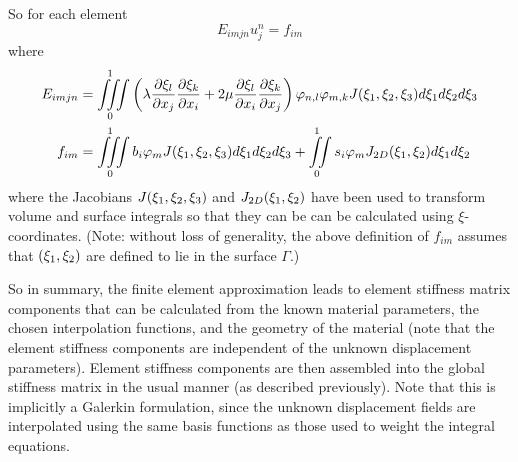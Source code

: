 So for each element
\begin{equation*}
  E_{imjn} u_{j}^{n} = f_{im}
\end{equation*}
where
\begin{gather}
  \begin{aligned}
    E_{imjn} &= \iiint\limits_{0}^{1} \left(  \lambda
        \dfrac{\partial \xi_{l}}{\partial x_{j}}  \dfrac{\partial \xi_{k}}{\partial x_{i}}  + 2\mu
        \dfrac{\partial \xi_{l}}{\partial x_{i}}  \dfrac{\partial \xi_{k}}{\partial x_{j}}  \right) 
        \varphi_{n,l}   \varphi_{m,k}  J(\xi_{1},\xi_{2},\xi_{3}) d\xi_{1}
       d\xi_{2} d\xi_{3} \\ 
    f_{im} &= \iiint\limits_{0}^{1} b_{i} \varphi_{m} 
       J(\xi_{1},\xi_{2},\xi_{3}) d\xi_{1} d\xi_{2} d\xi_{3} +
       \iint\limits_{0}^{1} s_{i} \varphi_{m}  
       J_{2D}(\xi_{1},\xi_{2}) d\xi_{1} d\xi_{2}
  \end{aligned}
\end{gather}
where the Jacobians $J(\xi_{1},\xi_{2},\xi_{3})$ and $J_{2D}(\xi_{1},\xi_{2})$
have been used to transform volume and surface integrals so that they can be
can be calculated using $\xi$-coordinates. (Note: without loss of generality,
the above definition of $f_{im}$ assumes that $(\xi_{1},\xi_{2})$ are defined to
lie in the surface $\Gamma$.)

So in summary, the finite element approximation leads to element stiffness
matrix components that can be calculated from the known material parameters,
the chosen interpolation functions, and the geometry of the material (note
that the element stiffness components are independent of the unknown
displacement parameters).  Element stiffness components are then assembled
into the global stiffness matrix in the usual manner (as described
previously).  Note that this is implicitly a Galerkin formulation, since the
unknown displacement fields are interpolated using the same basis functions as
those used to weight the integral equations.

  


%    

